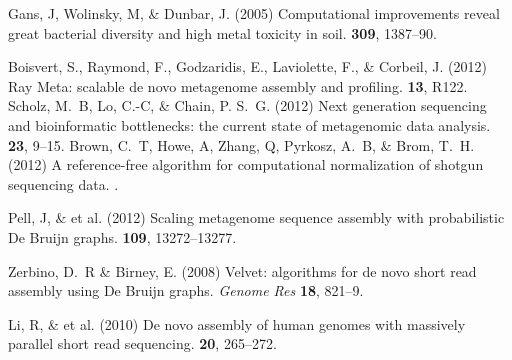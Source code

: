 \documentclass{pnastwo}
\begin{document}
\begin{article}
\begin{thebibliography}{10}
 Gans, J, Wolinsky, M, \& Dunbar, J. \newblock (2005)
Computational improvements reveal great bacterial diversity and high metal
toxicity in soil.  {\bf 309}, 1387--90.

 Boisvert, S., Raymond, F., Godzaridis, E., Laviolette, F., \& Corbeil, J. \newblock (2012) Ray Meta:
scalable de novo metagenome assembly and profiling.  {\bf 13}, R122.
 Scholz, M.~B, Lo, C.-C, \& Chain, P. S.~G. \newblock
(2012) Next generation sequencing and bioinformatic bottlenecks: the current
state of metagenomic data analysis.  {\bf 23}, 9--15.
%
 Brown, C.~T, Howe, A, Zhang, Q, Pyrkosz, A.~B, \& Brom,
T.~H. \newblock (2012) A reference-free algorithm for computational
normalization of shotgun sequencing data. .
%

 Pell, J, \& et al. \newblock (2012) {Scaling metagenome sequence assembly
with probabilistic De Bruijn graphs}.  {\bf 109}, 13272--13277.

%


 Zerbino, D.~R \& Birney, E. \newblock (2008) Velvet:
algorithms for de novo short read assembly using De Bruijn graphs. \newblock
{\em Genome Res} {\bf 18}, 821--9.

 Li, R, \& et al. \newblock
(2010) {De novo assembly of human genomes with massively parallel short read
sequencing}.  {\bf 20}, 265--272.



\end{thebibliography}
\end{article}
\end{document}
